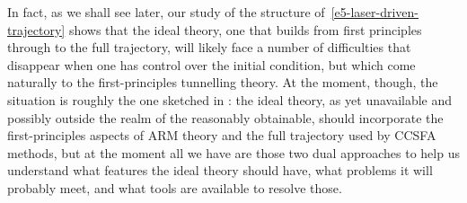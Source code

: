 In fact, as we shall see later, our study of the structure of~\eqref{e5-laser-driven-trajectory} shows that the ideal theory, one that builds from first principles through to the full trajectory, will likely face a number of difficulties that disappear when one has control over the initial condition, but which come naturally to the first-principles tunnelling theory. At the moment, though, the situation is roughly the one sketched in : the ideal theory, as yet unavailable and possibly outside the realm of the reasonably obtainable, should incorporate the first-principles aspects of ARM theory and the full trajectory used by CCSFA methods, but at the moment all we have are those two dual approaches to help us understand what features the ideal theory should have, what problems it will probably meet, and what tools are available to resolve those.






